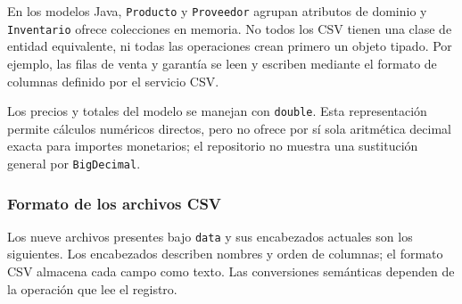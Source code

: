 En los modelos Java, \texttt{Producto} y \texttt{Proveedor} agrupan atributos de dominio y \texttt{Inventario} ofrece colecciones en memoria. No todos los CSV tienen una clase de entidad equivalente, ni todas las operaciones crean primero un objeto tipado. Por ejemplo, las filas de venta y garantía se leen y escriben mediante el formato de columnas definido por el servicio CSV.

Los precios y totales del modelo se manejan con \texttt{double}. Esta representación permite cálculos numéricos directos, pero no ofrece por sí sola aritmética decimal exacta para importes monetarios; el repositorio no muestra una sustitución general por \texttt{BigDecimal}.

\subsubsection{Formato de los archivos CSV}

Los nueve archivos presentes bajo \texttt{data} y sus encabezados actuales son los siguientes. Los encabezados describen nombres y orden de columnas; el formato CSV almacena cada campo como texto. Las conversiones semánticas dependen de la operación que lee el registro.

